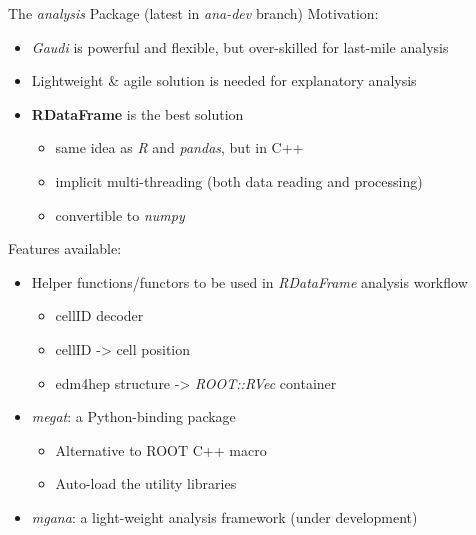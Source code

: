 \documentclass[11pt,t,aspectratio=169]{beamer}
\begin{document}
\begin{frame}[fragile]{The \textit{analysis} Package (latest in \textit{ana-dev}
    branch)} 
  Motivation:
  \begin{itemize}
  \item \textit{Gaudi} is powerful and flexible, but over-skilled for last-mile analysis
  \item Lightweight \& agile solution is needed for explanatory analysis
  \item \textbf{RDataFrame} is the best solution
    \begin{itemize}
    \item same idea as \textit{R} and \textit{pandas}, but in C++
    \item implicit multi-threading (both data reading and processing)
    \item convertible to \textit{numpy}
    \end{itemize}
  \end{itemize}
  
  \vfill
  Features available:
  \begin{itemize}
  \item Helper functions/functors to be used in \textit{RDataFrame} analysis workflow
    \begin{itemize}
    \item cellID decoder
    \item cellID -> cell position
    \item edm4hep structure -> \textit{ROOT::RVec} container
    \end{itemize}
  \item \textit{megat}: a Python-binding package
    \begin{itemize}
    \item Alternative to ROOT C++ macro
    \item Auto-load the utility libraries
    \end{itemize}
  \item \textit{mgana}: a light-weight analysis framework (under development)
  \end{itemize}
\end{frame}
\end{document}
